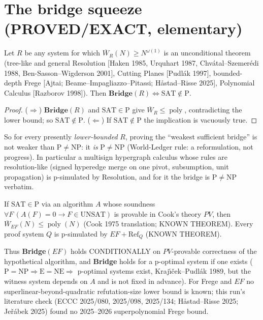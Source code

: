 \documentclass[11pt]{article}
\newcommand{\UNSAT}{\mathrm{UNSAT}}\newcommand{\SAT}{\mathrm{SAT}}
\newcommand{\poly}{\operatorname{poly}}
\begin{document}
\section{The bridge squeeze (PROVED/EXACT, elementary)}
\begin{proposition}
Let $R$ be any system for which $\overline W_R(N)\ge N^{\omega(1)}$ is an
unconditional theorem (tree-like and general Resolution [Haken 1985, Urquhart
1987, Chv\'atal--Szemer\'edi 1988, Ben-Sasson--Wigderson 2001], Cutting Planes
[Pudl\'ak 1997], bounded-depth Frege [Ajtai; Beame--Impagliazzo--Pitassi;
H\aa stad--Risse 2025], Polynomial Calculus [Razborov 1998]). Then
$\textbf{Bridge}(R)\iff\SAT\notin\mathrm P$.
\end{proposition}
\begin{proof}
($\Rightarrow$) $\textbf{Bridge}(R)$ and $\SAT\in\mathrm P$ give
$\overline W_R\le\poly$, contradicting the lower bound; so $\SAT\notin\mathrm P$.
($\Leftarrow$) If $\SAT\notin\mathrm P$ the implication is vacuously true.
\end{proof}
So for every presently \emph{lower-bounded} $R$, proving the ``weakest
sufficient bridge'' is not weaker than P$\ne$NP: it \emph{is} P$\ne$NP
(World-Ledger rule: a reformulation, not progress). In particular a multisign
hypergraph calculus whose rules are resolution-like (signed hyperedge merge on
one pivot, subsumption, unit propagation) is p-simulated by Resolution, and for
it the bridge is P$\ne$NP verbatim.

\begin{proposition}
If $\SAT\in\mathrm P$ via an algorithm $A$ whose soundness
$\forall F\,(A(F)=0\to F\in\UNSAT)$ is provable in Cook's theory $PV$, then
$\overline W_{EF}(N)\le\poly(N)$ (Cook 1975 translation; KNOWN THEOREM). Every
proof system $Q$ is p-simulated by $EF+\mathrm{Ref}_Q$ (KNOWN THEOREM).
\end{proposition}
Thus \textbf{Bridge}$(EF)$ holds CONDITIONALLY on $PV$-provable correctness of
the hypothetical algorithm, and \textbf{Bridge} holds for a p-optimal system
if one exists ($\mathrm P=\mathrm{NP}\Rightarrow\mathrm E=\mathrm{NE}
\Rightarrow$ p-optimal systems exist, Kraj\'\i\v{c}ek--Pudl\'ak 1989, but the
witness system depends on $A$ and is not fixed in advance). For Frege and $EF$
no superlinear-beyond-quadratic refutation-size lower bound is known; this run's
literature check (ECCC 2025/080, 2025/098, 2025/134; H\aa stad--Risse 2025;
Je\v{r}\'abek 2025) found no 2025--2026 superpolynomial Frege bound.
\end{document}
